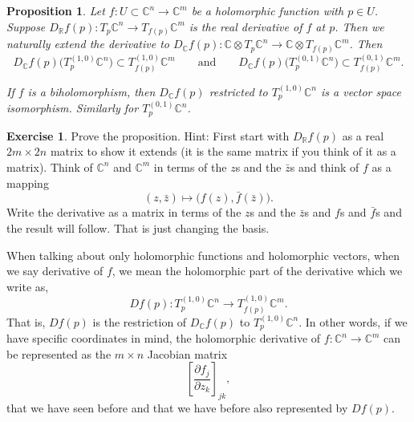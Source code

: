 \documentclass[12pt,openany]{book}
\newcommand{\C}{{\mathbb{C}}}
\newcommand{\R}{{\mathbb{R}}}
\theoremstyle{plain}
\newtheorem{prop}[thm]{Proposition}
\theoremstyle{remark}
\theoremstyle{definition}
\newenvironment{exbox}{%
    \def\FrameCommand{\vrule width 1pt \relax\hspace {10pt}}%
    \MakeFramed {\advance \hsize -\width \FrameRestore }%
}{%
    \endMakeFramed
}
\theoremstyle{exercise}
\newtheorem{exercise}{Exercise}[section]
\theoremstyle{example}
\begin{document}
\begin{prop} \label{prop:holvectmap}
Let $f \colon U \subset \C^n \to \C^m$ be a holomorphic function with
$p \in U$.
Suppose 
$D_\R f(p) \colon T_p\C^n \to T_{f(p)} \C^m$
is the real derivative of $f$ at $p$.
Then we naturally
extend the derivative to $D_\C f(p) \colon \C \otimes T_p\C^n \to \C \otimes  T_{f(p)}
\C^m$.  Then
\begin{equation*}
D_\C f(p)\bigl(T_p^{(1,0)} \C^n\bigr) \subset T_{f(p)}^{(1,0)} \C^m
\qquad \text{and} \qquad
D_\C f(p)\bigl(T_p^{(0,1)} \C^n\bigr) \subset T_{f(p)}^{(0,1)} \C^m .
\end{equation*}

If $f$ is a biholomorphism, then $D_\C f(p)$ restricted to $T_p^{(1,0)} \C^n$
is a vector space isomorphism.  Similarly for $T_p^{(0,1)} \C^n$.
\end{prop}

\begin{exbox}
\begin{exercise}
Prove the proposition.
Hint: First start with $D_\R f(p)$ as a real $2m \times 2n$ matrix to show it
extends (it is the same matrix if you think of it as a matrix).  Think of $\C^n$ and $\C^m$ in terms of the $z$s and the
$\bar{z}$s and think of $f$ as a mapping
\begin{equation*}
(z,\bar{z}) \mapsto \bigl( f(z) , \bar{f}(\bar{z}) \bigr) .
\end{equation*}
Write the derivative as a matrix in terms of the $z$s and the $\bar{z}$s
and $f$s and $\bar{f}$s and the result will follow.  That is just changing
the basis.
\end{exercise}
\end{exbox}

When talking about only holomorphic functions and holomorphic vectors,
when we say derivative of $f$, we mean the holomorphic part of the
derivative which we write as,
\begin{equation*}
D f(p) \colon T_p^{(1,0)} \C^n \to T_{f(p)}^{(1,0)} \C^m .
\end{equation*}
That is, $Df(p)$ is the restriction of $D_\C f(p)$ to $T_p^{(1,0)} \C^n$.
In other words,
if we have specific coordinates in mind, the
holomorphic derivative of $f \colon \C^{n} \to \C^m$ can be represented
as the $m \times n$ Jacobian matrix
\begin{equation*}
\left[
\frac{\partial f_j}{\partial z_k}
\right]_{jk} ,
\end{equation*}
that we have seen before and that we have before also represented by
$Df(p)$.
\end{document}

